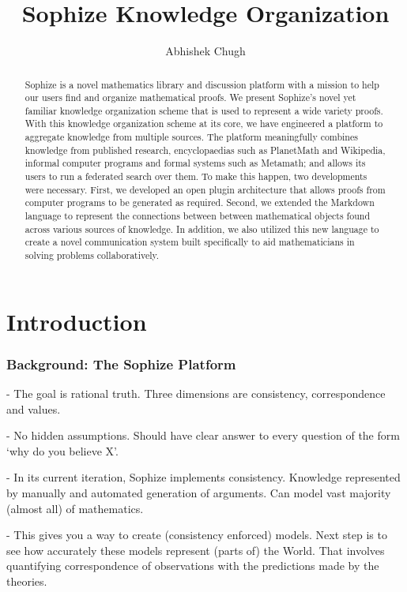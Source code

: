 \documentclass[a4paper]{article}
\title{Sophize Knowledge Organization}
\author{ Abhishek Chugh }
\begin{document}
\maketitle

\begin{abstract}
Sophize is a novel mathematics library and discussion platform with a mission to help our users find and organize mathematical proofs. We present Sophize's novel yet familiar knowledge organization scheme that is used to represent a wide variety proofs. With this knowledge organization scheme at its core, we have engineered a platform to aggregate knowledge from multiple sources. The platform meaningfully combines knowledge from published research, encyclopaedias such as PlanetMath and Wikipedia, informal computer programs and formal systems such as Metamath; and allows its users to run a federated search over them. To make this happen, two developments were necessary. First, we developed an open plugin architecture that allows proofs from computer programs to be generated as required. Second, we extended the Markdown language to represent the connections between between mathematical objects found across various sources of knowledge. In addition, we also utilized this new language to create a novel communication system built specifically to aid mathematicians in solving problems collaboratively.

\end{abstract}

\vskip 32pt

\section{Introduction}

\subsubsection*{Background: The Sophize Platform}

- The goal is rational truth. Three dimensions are consistency, correspondence and values.

- No hidden assumptions. Should have clear answer to every question of the form `why do you believe X'.

- In its current iteration, Sophize implements consistency. Knowledge represented by manually and automated generation of arguments. Can model vast majority (almost all) of mathematics.

- This gives you a way to create (consistency enforced) models. Next step is to see how accurately these models represent (parts of) the World. That involves quantifying correspondence of observations with the predictions made by the theories.
\end{document}
